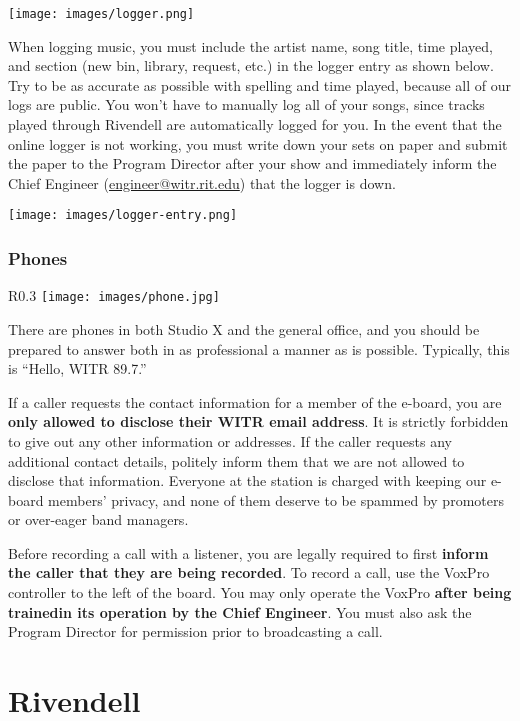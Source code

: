 \documentclass{witrman}
\begin{document}
\texttt{[image: images/logger.png]}

When logging music, you must include the artist name, song title, time played,
and section (new bin, library, request, etc.) in the logger entry as shown
below.  Try to be as accurate as possible with spelling and time played, because
all of our logs are public.  You won't have to manually log all of your songs,
since tracks played through Rivendell are automatically logged for you.  In the
event that the online logger is not working, you must write down your sets on
paper and submit the paper to the Program Director after your show and
immediately inform the Chief Engineer
(\href{mailto:engineer@witr.rit.edu}{engineer@witr.rit.edu}) that the logger is
down.

\texttt{[image: images/logger-entry.png]}

\subsection{Phones}

\begin{wrapfigure}{R}{0.3\linewidth}
    \centering
    \texttt{[image: images/phone.jpg]}
\end{wrapfigure}

There are phones in both Studio X and the general office, and you should be
prepared to answer both in as professional a manner as is possible.  Typically,
this is ``Hello, WITR 89.7.''

If a caller requests the contact information for a member of the e-board, you
are \textbf{only allowed to disclose their WITR email address}.  It is strictly
forbidden to give out any other information or addresses.  If the caller
requests any additional contact details, politely inform
them that we are not allowed to disclose that information.  Everyone at the
station is charged with keeping our e-board members' privacy, and none of them
deserve to be spammed by promoters or over-eager band managers.

Before recording a call with a listener, you are legally required to first 
\textbf{inform the caller that they are being recorded}.  To record a
call, use the VoxPro controller to the left of the board.  You may only operate
the VoxPro \textbf{after being trainedin its operation by the Chief
Engineer}.  You must also ask the Program Director for permission prior to
broadcasting a call.


\chapter{Rivendell}
\end{document}
